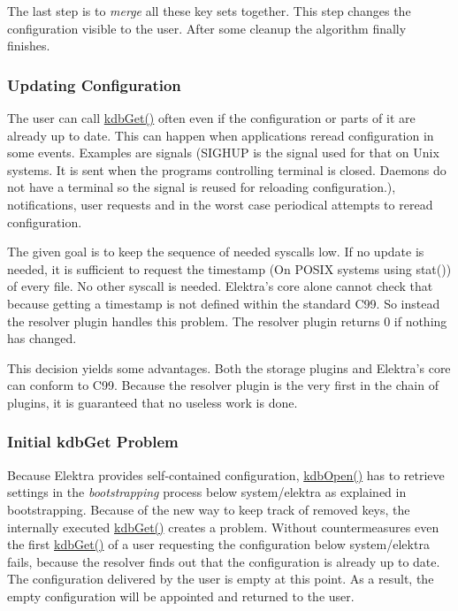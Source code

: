 The last step is to {\itshape merge} all these key sets together. This step changes the configuration visible to the user. After some cleanup the algorithm finally finishes.

\subsubsection*{Updating Configuration}

The user can call {\ttfamily \hyperlink{group__kdb_ga28e385fd9cb7ccfe0b2f1ed2f62453a1}{kdb\+Get()}} often even if the configuration or parts of it are already up to date. This can happen when applications reread configuration in some events. Examples are signals (S\+I\+G\+H\+UP is the signal used for that on Unix systems. It is sent when the program\textquotesingle{}s controlling terminal is closed. Daemons do not have a terminal so the signal is reused for reloading configuration.), notifications, user requests and in the worst case periodical attempts to reread configuration.

The given goal is to keep the sequence of needed syscalls low. If no update is needed, it is sufficient to request the timestamp (On P\+O\+S\+IX systems using {\ttfamily stat()}) of every file. No other syscall is needed. Elektra’s core alone cannot check that because getting a timestamp is not defined within the standard C99. So instead the resolver plugin handles this problem. The resolver plugin returns 0 if nothing has changed.

This decision yields some advantages. Both the storage plugins and Elektra’s core can conform to C99. Because the resolver plugin is the very first in the chain of plugins, it is guaranteed that no useless work is done.

\subsubsection*{Initial kdb\+Get Problem}

Because Elektra provides self-\/contained configuration, {\ttfamily \hyperlink{group__kdb_ga6808defe5870f328dd17910aacbdc6ca}{kdb\+Open()}} has to retrieve settings in the {\itshape bootstrapping} process below {\ttfamily system/elektra} as explained in {\ttfamily bootstrapping}. Because of the new way to keep track of removed keys, the internally executed {\ttfamily \hyperlink{group__kdb_ga28e385fd9cb7ccfe0b2f1ed2f62453a1}{kdb\+Get()}} creates a problem. Without countermeasures even the first {\ttfamily \hyperlink{group__kdb_ga28e385fd9cb7ccfe0b2f1ed2f62453a1}{kdb\+Get()}} of a user requesting the configuration below {\ttfamily system/elektra} fails, because the resolver finds out that the configuration is already up to date. The configuration delivered by the user is empty at this point. As a result, the empty configuration will be appointed and returned to the user.

